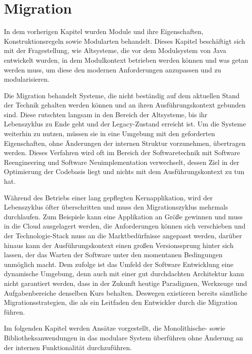 \chapter{Migration}

	In dem vorherigen Kapitel wurden Module und ihre Eigenschaften, Konstruktionsregeln sowie Modularten behandelt. Dieses Kapitel beschäftigt sich mit der Fragestellung, wie Altsysteme, die vor dem Modulsystem von Java entwickelt wurden, in dem Modulkontext betrieben werden können und was getan werden muss, um diese den modernen Anforderungen anzupassen und zu modularisieren.\bigbreak

	Die Migration behandelt Systeme, die nicht beständig auf dem aktuellen Stand der Technik gehalten werden können und an ihren Ausführungskontext gebunden sind. Diese rutschten langsam in den Bereich der Altsysteme, bis ihr Lebenszyklus zu Ende geht und der Legacy-Zustand erreicht ist. Um die Systeme weiterhin zu nutzen, müssen sie in eine Umgebung mit den geforderten Eigenschaften, ohne Änderungen der internen Struktur vorzunehmen, übertragen werden. Dieses Verfahren wird oft im Bereich der Softwaretechnik mit Software Reengineering und Software Neuimplementation verwechselt, dessen Ziel in der Optimierung der Codebasis liegt und nichts mit dem Ausführungskontext zu tun hat. \cite{martens2016ablosung} \bigbreak

	Während des Betriebs einer lang gepflegten Kernapplikation, wird der Lebenszyklus öfter überschritten und muss den Migrationszyklus mehrmals durchlaufen. Zum Beispiele kann eine Applikation an Größe gewinnen und muss in die Cloud ausgelagert werden, die Anforderungen können sich verschieben und der Technologie-Stack muss an die Marktbedürfnisse angepasst werden, darüber hinaus kann der Ausführungskontext einen großen Versionssprung hinter sich lassen, der das Warten der Software unter den momentanen Bedingungen unmöglich macht. \newline
	Dem zufolge ist das Umfeld der Software Entwicklung eine dynamische Umgebung, denn auch mit einer gut durchdachten Architektur kann nicht garantiert werden, dass in der Zukunft heutige Paradigmen, Werkzeuge und Aufgabenbereiche denselben Kurs behalten. Deswegen existieren bereits sämtliche Migrationsstrategien, die als ein Leitfaden den Entwickler durch die Migration führen. \bigbreak

	Im folgenden Kapitel werden Ansätze vorgestellt, die Monolithische- sowie Bibliotheksanwendungen in das modulare System überführen ohne Änderung an der internen Funktionalität durchzuführen. 


